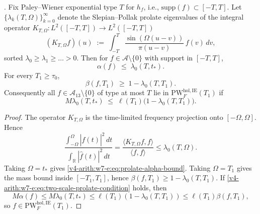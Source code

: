 \begin{theorem}
\label{v4-arith:w7-e:thm:prolate-characterization}
\ClaimStatusProvedHere. Fix Paley--Wiener exponential type \(T\) for
\(h_f\), i.e., \(\mathrm{supp}(f)\subset[-T,T]\). Let
\(\{\lambda_{k}(T,\Omega)\}_{k=0}^{\infty}\) denote the
Slepian--Pollak prolate eigenvalues of the integral operator
\(K_{T,\Omega}\colon L^{2}([-T,T])\to L^{2}([-T,T])\)
\begin{equation}
\label{v4-arith:w7-e:eq:prolate-operator}
(K_{T,\Omega}f)(u)\;:=\;\int_{-T}^{T}\frac{\sin(\Omega(u-v))}{\pi(u-v)}\,f(v)\,dv,
\end{equation}
sorted \(\lambda_{0}\geq\lambda_{1}\geq\ldots>0\). Then for
\(f\in\mathscr A\setminus\{0\}\) with support in \([-T,T]\),
\begin{equation}
\label{v4-arith:w7-e:eq:prolate-alpha-bound}
\alpha(f)\;\leq\;\lambda_{0}(T,t_{\ast}).
\end{equation}
For every \(T_{1}\geq \tau_0\),
\begin{equation}
\label{v4-arith:w7-e:eq:prolate-beta-bound}
\beta(f,T_{1})\;\geq\;1-\lambda_{0}(T,T_{1}).
\end{equation}
Consequently all \(f\in\mathscr A_{13}\setminus\{0\}\) of type at most
\(T\) lie in \(\mathrm{PW}^{\mathrm{hol},\mathrm{IE}}_{F}(T_{1})\) if
\begin{equation}
\label{v4-arith:w7-e:eq:two-scale-prolate-condition}
M\lambda_{0}(T,t_{\ast})\;\leq\;
\ell(T_{1})\bigl(1-\lambda_{0}(T,T_{1})\bigr).
\end{equation}
\end{theorem}

\begin{proof}
The operator \(K_{T,\Omega}\) is the time-limited frequency projection
onto \([-\Omega,\Omega]\). Hence
\[
\frac{\int_{-\Omega}^{\Omega}|\widehat f(t)|^{2}\,dt}
{\int_{\mathbb R}|\widehat f(t)|^{2}\,dt}
=\frac{\langle K_{T,\Omega}f,f\rangle}{\langle f,f\rangle}
\leq \lambda_{0}(T,\Omega).
\]
Taking \(\Omega=t_{\ast}\) gives
\eqref{v4-arith:w7-e:eq:prolate-alpha-bound}. Taking
\(\Omega=T_{1}\) gives the mass bound inside \([-T_{1},T_{1}]\), hence
\(\beta(f,T_{1})\geq1-\lambda_{0}(T,T_{1})\). If
\eqref{v4-arith:w7-e:eq:two-scale-prolate-condition} holds, then
\[
M\alpha(f)\leq M\lambda_{0}(T,t_{\ast})
\leq \ell(T_{1})(1-\lambda_{0}(T,T_{1}))
\leq \ell(T_{1})\beta(f,T_{1}),
\]
so \(f\in\mathrm{PW}^{\mathrm{hol},\mathrm{IE}}_{F}(T_{1})\).
\end{proof}

